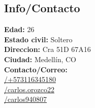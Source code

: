 \documentclass[]{cv-class}
\begin{document}
\begin{aside}
	\section{Info/Contacto}
	\textbf{Edad:} 26 \\
	\textbf{Estado civil:} Soltero \\
	\textbf{Direccion:} Cra 51D 67A16 \\
	\textbf{Ciudad:} Medellín, CO \\ 
	\textbf{Contacto/Correo:}\\ \href{https://api.whatsapp.com/send?phone=573116345180}{/+573116345180}\\
	\href{https://join.skype.com/invite/GVNxPbWtJxdc}{/carlos.orozco22}\\
	\href{mailto:carlos940807@gmail.com}{/carlos940807}
	~

\end{aside}
\end{document}
